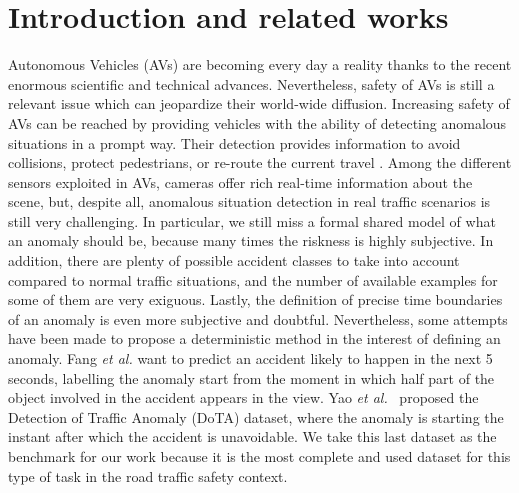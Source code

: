 \section{Introduction and related works}

Autonomous Vehicles (AVs) are becoming every day a reality thanks to the recent enormous scientific and technical advances.
Nevertheless, safety of AVs is still a relevant issue which can jeopardize their world-wide diffusion.
Increasing safety of AVs can be reached by providing vehicles with the ability of detecting anomalous situations in a prompt way.
Their detection provides information to avoid collisions, protect pedestrians, or re-route the current travel \cite{4298901}.
Among the different sensors exploited in AVs, cameras offer rich real-time information about the scene, but, despite all, anomalous situation detection in real traffic scenarios is still very challenging.
In particular, we still miss a formal shared model of what an anomaly should be, because many times the riskness is highly subjective.
In addition, there are plenty of possible accident classes to take into account compared to normal traffic situations, and the number of available examples for some of them are very exiguous.
Lastly, the definition of precise time boundaries of an anomaly is even more subjective and doubtful.
Nevertheless, some attempts have been made to propose a deterministic method in the interest of defining an anomaly.
Fang \emph{et al.} \cite{fang2019dada} want to predict an accident likely to happen in the next 5 seconds, labelling the anomaly start from the moment in which half part of the object involved in the accident appears in the view.
Yao \emph{et al.}~\cite{9712446} proposed the Detection of Traffic Anomaly (DoTA) dataset, 
where the anomaly is starting the instant after which the accident is unavoidable. %
We take this last dataset as the benchmark for our work because it is the most complete and used dataset for this type of task in the road traffic safety context.

